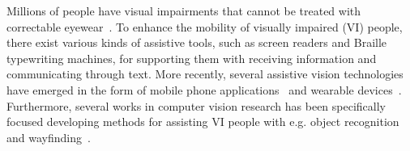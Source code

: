 Millions of people have visual impairments that cannot be treated with correctable eyewear~\cite{bourne2021trends}. To enhance the mobility of visually impaired (VI) people, there exist various kinds of assistive tools, such as screen readers and Braille typewriting machines, for supporting them with receiving information and communicating through text. 
More recently, several assistive vision technologies have emerged in the form of mobile phone applications~\cite{microsoft2017seeing, clary2018lookout,cloudsight2013taptapsee, envision2018app,bemyeyes2017be, aira2017aira} and wearable devices~\cite{orcam2019myeye, envision2020glasses,caraiman2017soundofvision}. Furthermore, several works in computer vision research has been specifically focused developing methods for assisting VI people with e.g. object recognition~\cite{ahmetovic2020recog, jafri2014computer, kacorri2017teachable,gurari2018vizwiz,massiceti2021orbit,kacorri2017people,lee2019hands,lee2019revisiting} and wayfinding~\cite{coughlan2009functional, kacorri2018environmental, loomis2020assisting,szpiro2016finding,tian2013toward,lee2020pedestrian}. 




